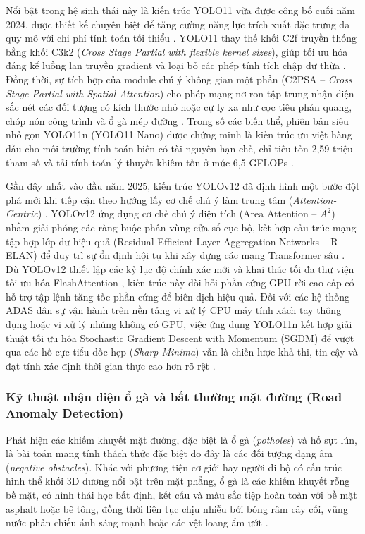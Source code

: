 \documentclass[12pt,a4paper]{article}
\begin{document}
Nổi bật trong hệ sinh thái này là kiến trúc YOLO11 vừa được công bố cuối năm 2024, được thiết kế chuyên biệt để tăng cường năng lực trích xuất đặc trưng đa quy mô với chi phí tính toán tối thiểu \cite{3, 4}. YOLO11 thay thế khối C2f truyền thống bằng khối C3k2 (\textit{Cross Stage Partial with flexible kernel sizes}), giúp tối ưu hóa đáng kể luồng lan truyền gradient và loại bỏ các phép tính tích chập dư thừa \cite{4}. Đồng thời, sự tích hợp của module chú ý không gian một phần (C2PSA -- \textit{Cross Stage Partial with Spatial Attention}) cho phép mạng nơ-ron tập trung nhận diện sắc nét các đối tượng có kích thước nhỏ hoặc cự ly xa như cọc tiêu phản quang, chóp nón công trình và ổ gà mép đường \cite{4, 16}. Trong số các biến thể, phiên bản siêu nhỏ gọn YOLO11n (YOLO11 Nano) được chứng minh là kiến trúc ưu việt hàng đầu cho môi trường tính toán biên có tài nguyên hạn chế, chỉ tiêu tốn 2,59 triệu tham số và tải tính toán lý thuyết khiêm tốn ở mức 6,5 GFLOPs \cite{4, 16}.

Gần đây nhất vào đầu năm 2025, kiến trúc YOLOv12 đã định hình một bước đột phá mới khi tiếp cận theo hướng lấy cơ chế chú ý làm trung tâm (\textit{Attention-Centric}) \cite{1}. YOLOv12 ứng dụng cơ chế chú ý diện tích (Area Attention -- $A^2$) nhằm giải phóng các ràng buộc phân vùng cửa sổ cục bộ, kết hợp cấu trúc mạng tập hợp lớp dư hiệu quả (Residual Efficient Layer Aggregation Networks -- R-ELAN) để duy trì sự ổn định hội tụ khi xây dựng các mạng Transformer sâu \cite{1, 2}. Dù YOLOv12 thiết lập các kỷ lục độ chính xác mới và khai thác tối đa thư viện tối ưu hóa FlashAttention \cite{2}, kiến trúc này đòi hỏi phần cứng GPU rời cao cấp có hỗ trợ tập lệnh tăng tốc phần cứng để biên dịch hiệu quả. Đối với các hệ thống ADAS dân sự vận hành trên nền tảng vi xử lý CPU máy tính xách tay thông dụng hoặc vi xử lý nhúng không có GPU, việc ứng dụng YOLO11n kết hợp giải thuật tối ưu hóa Stochastic Gradient Descent with Momentum (SGDM) để vượt qua các hố cực tiểu dốc hẹp (\textit{Sharp Minima}) vẫn là chiến lược khả thi, tin cậy và đạt tính xác định thời gian thực cao hơn rõ rệt \cite{3, 4}.

\subsubsection{Kỹ thuật nhận diện ổ gà và bất thường mặt đường (Road Anomaly Detection)}
Phát hiện các khiếm khuyết mặt đường, đặc biệt là ổ gà (\textit{potholes}) và hố sụt lún, là bài toán mang tính thách thức đặc biệt do đây là các đối tượng dạng âm (\textit{negative obstacles}). Khác với phương tiện cơ giới hay người đi bộ có cấu trúc hình thể khối 3D dương nổi bật trên mặt phẳng, ổ gà là các khiếm khuyết rỗng bề mặt, có hình thái học bất định, kết cấu và màu sắc tiệp hoàn toàn với bề mặt asphalt hoặc bê tông, đồng thời liên tục chịu nhiễu bởi bóng râm cây cối, vũng nước phản chiếu ánh sáng mạnh hoặc các vệt loang ẩm ướt \cite{6, 11}.
\end{document}
